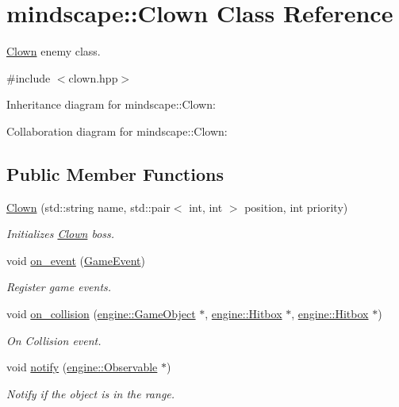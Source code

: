 \hypertarget{classmindscape_1_1_clown}{}\section{mindscape\+:\+:Clown Class Reference}
\label{classmindscape_1_1_clown}


\hyperlink{classmindscape_1_1_clown}{Clown} enemy class.  




{\ttfamily \#include $<$clown.\+hpp$>$}



Inheritance diagram for mindscape\+:\+:Clown\+:


Collaboration diagram for mindscape\+:\+:Clown\+:
\subsection*{Public Member Functions}
\begin{DoxyCompactItemize}
\item 
\hyperlink{classmindscape_1_1_clown_a193ba548dc86723e9f9dc3837b303dcf}{Clown} (std\+::string name, std\+::pair$<$ int, int $>$ position, int priority)
\begin{DoxyCompactList}\small\item\em Initializes \hyperlink{classmindscape_1_1_clown}{Clown} boss. \end{DoxyCompactList}\item 
void \hyperlink{classmindscape_1_1_clown_a54e259fdb78e80ea53b8ff2c9c4d7e13}{on\+\_\+event} (\hyperlink{class_game_event}{Game\+Event})
\begin{DoxyCompactList}\small\item\em Register game events. \end{DoxyCompactList}\item 
void \hyperlink{classmindscape_1_1_clown_a738d25a413d4c112e4e98ef3d9da8520}{on\+\_\+collision} (\hyperlink{classengine_1_1_game_object}{engine\+::\+Game\+Object} $\ast$, \hyperlink{classengine_1_1_hitbox}{engine\+::\+Hitbox} $\ast$, \hyperlink{classengine_1_1_hitbox}{engine\+::\+Hitbox} $\ast$)
\begin{DoxyCompactList}\small\item\em On Collision event. \end{DoxyCompactList}\item 
void \hyperlink{classmindscape_1_1_clown_a0c5d3fc9f693402084cbcbc1b7110124}{notify} (\hyperlink{classengine_1_1_observable}{engine\+::\+Observable} $\ast$)
\begin{DoxyCompactList}\small\item\em Notify if the object is in the range. \end{DoxyCompactList}\end{DoxyCompactItemize}
